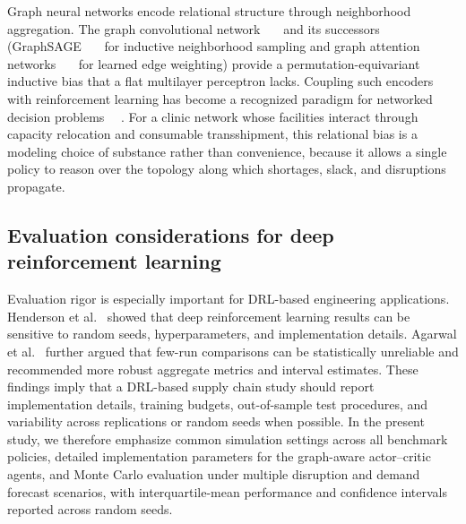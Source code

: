 \documentclass[preprint,review,12pt,nonatbib]{elsarticle}
\providecommand{\DIFadd}[1]{{\protect\color{blue}#1}} %
\providecommand{\DIFdel}[1]{} %
\providecommand{\DIFaddbegin}{} %
\providecommand{\DIFaddend}{} %
\providecommand{\DIFdelbegin}{} %
\providecommand{\DIFdelend}{} %
\providecommand{\DIFscaledelfig}{0.5}
\newlength{\DIFdelgraphicswidth} %
\newlength{\DIFdelgraphicsheight} %
\providecommand{\DIFaddincludegraphics}[2][]{{\color{blue}\fbox{\DIFOincludegraphics[#1]{#2}}}} %
\providecommand{\DIFdelincludegraphics}[2][]{%
\sbox{\DIFdelgraphicsbox}{\DIFOincludegraphics[#1]{#2}}%
\settoboxwidth{\DIFdelgraphicswidth}{\DIFdelgraphicsbox} %
\settoboxtotalheight{\DIFdelgraphicsheight}{\DIFdelgraphicsbox} %
\scalebox{\DIFscaledelfig}{%
\parbox[b]{\DIFdelgraphicswidth}{\usebox{\DIFdelgraphicsbox}\\[-\baselineskip] \rule{\DIFdelgraphicswidth}{0em}}\llap{\resizebox{\DIFdelgraphicswidth}{\DIFdelgraphicsheight}{%
\setlength{\unitlength}{\DIFdelgraphicswidth}%
\begin{picture}(1,1)%
\thicklines\linethickness{2pt} %
{\color[rgb]{1,0,0}\put(0,0){\framebox(1,1){}}}%
{\color[rgb]{1,0,0}\put(0,0){\line( 1,1){1}}}%
{\color[rgb]{1,0,0}\put(0,1){\line(1,-1){1}}}%
\end{picture}%
}\hspace*{3pt}}} %
} %
\DeclareRobustCommand{\DIFaddbegin}{\DIFOaddbegin \let\includegraphics\DIFaddincludegraphics} %
\DeclareRobustCommand{\DIFaddend}{\DIFOaddend \let\includegraphics\DIFOincludegraphics} %
\DeclareRobustCommand{\DIFdelbegin}{\DIFOdelbegin \let\includegraphics\DIFdelincludegraphics} %
\DeclareRobustCommand{\DIFdelend}{\DIFOaddend \let\includegraphics\DIFOincludegraphics} %
\begin{document}
\DIFadd{Graph neural networks encode relational structure through neighborhood aggregation. The graph convolutional network~\mbox{%
\cite{Kipf2017GCN} }\hskip0pt%
and its successors (GraphSAGE~\mbox{%
\cite{Hamilton2017GraphSAGE} }\hskip0pt%
for inductive neighborhood sampling and graph attention networks~\mbox{%
\cite{Velickovic2018GAT} }\hskip0pt%
for learned edge weighting) provide a permutation-equivariant inductive bias that a flat multilayer perceptron lacks. Coupling such encoders with reinforcement learning has become a recognized paradigm for networked decision problems~\mbox{%
\cite{Liu2024GNNMARLSurvey}}\hskip0pt%
. For a clinic network whose facilities interact through capacity relocation and consumable transshipment, this relational bias is a modeling choice of substance rather than convenience, because it allows a single policy to reason over the topology along which shortages, slack, and disruptions propagate.
}

\DIFaddend \subsection{Evaluation considerations for deep reinforcement learning}
Evaluation rigor is especially important for DRL-based engineering applications. Henderson et al.~\cite{Henderson2018DRLMatters} showed that deep reinforcement learning results can be sensitive to random seeds, hyperparameters, and implementation details. Agarwal et al.~\cite{Agarwal2021RLiable} further argued that few-run comparisons can be statistically unreliable and recommended more robust aggregate metrics and interval estimates. These findings imply that a DRL-based supply chain study should report implementation details, training budgets, out-of-sample test procedures, and variability across replications or random seeds when possible. In the present study, we therefore emphasize common simulation settings across all benchmark policies, detailed implementation parameters for the \DIFdelbegin \DIFdel{GCN-DDPG agent}\DIFdelend \DIFaddbegin \DIFadd{graph-aware actor--critic agents}\DIFaddend , and Monte Carlo evaluation under multiple disruption and demand forecast scenarios\DIFaddbegin \DIFadd{, with interquartile-mean performance and confidence intervals reported across random seeds}\DIFaddend .
\end{document}
